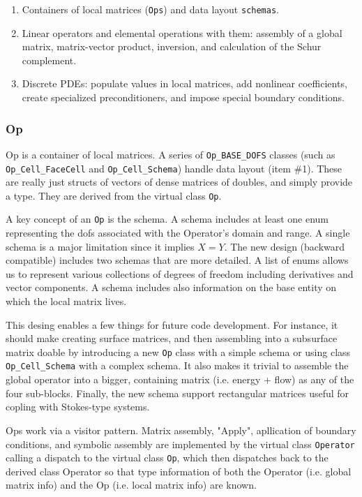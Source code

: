 \begin{enumerate}
\item Containers of local matrices ({\tt Ops}) and data layout {\tt schemas}.

\item Linear operators and elemental operations with them: assembly of a global 
      matrix, matrix-vector product, inversion, and calculation of the Schur complement.

\item Discrete PDEs: populate values in local matrices, add nonlinear 
coefficients, create specialized preconditioners, and impose special
boundary conditions. 
\end{enumerate}

\subsubsection{Op}
Op is a container of local matrices.
A series of {\tt Op\_BASE\_DOFS} classes (such as {\tt Op\_Cell\_FaceCell} and 
{\tt Op\_Cell\_Schema}) handle data layout (item \#1). 
These are really just structs of vectors of
dense matrices of doubles, and simply provide a type.
They are derived from the virtual class {\tt Op}.

A key concept of an {\tt Op} is the schema. 
A schema includes at least one enum representing the dofs associated
with the Operator's domain and range. A single schema is a major limitation 
since it implies $X=Y$.
The new design (backward compatible) includes two schemas that are more 
detailed. A list of enums allows us to represent various collections of 
degrees of freedom including derivatives and vector components.
A schema includes also information on the base entity on which the local 
matrix lives.

This desing enables a few things for future code development.
For instance, it should make creating surface matrices, and then assembling into a 
subsurface matrix doable by introducing a new {\tt Op} class with a simple schema
or using class {\tt Op\_Cell\_Schema} with a complex schema. 
It also makes it trivial to assemble the global operator into a bigger, containing 
matrix (i.e. energy + flow) as any of the four sub-blocks.
Finally, the new schema support rectangular matrices useful for copling with 
Stokes-type systems.

Ops work via a visitor pattern.
Matrix assembly, "Apply", apllication of boundary conditions, and symbolic assembly 
are implemented by the virtual class {\tt Operator} calling a dispatch to the 
virtual class {\tt Op}, which then dispatches back to the derived class Operator so that
type information of both the Operator (i.e. global matrix info) and 
the Op (i.e. local matrix info) are known.

